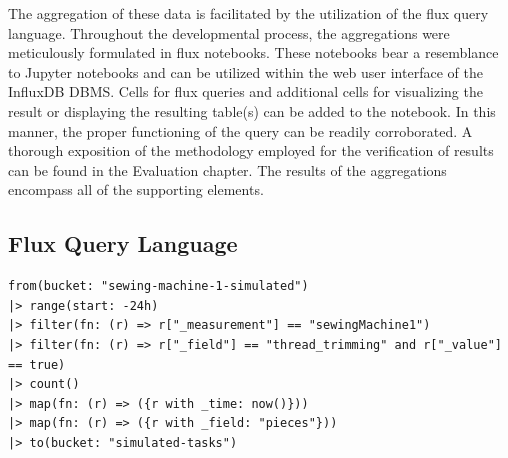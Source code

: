The aggregation of these data is facilitated by the utilization of the flux query language. Throughout the developmental process, the aggregations were meticulously formulated in flux notebooks. These notebooks bear a resemblance to Jupyter notebooks and can be utilized within the web user interface of the InfluxDB DBMS. Cells for flux queries and additional cells for visualizing the result or displaying the resulting table(s) can be added to the notebook. In this manner, the proper functioning of the query can be readily corroborated. A thorough exposition of the methodology employed for the verification of results can be found in the Evaluation chapter. The results of the aggregations encompass all of the supporting elements.

\subsection{Flux Query Language}
\begin{lstlisting}[style=FluxStyle, caption={Flux aggregation query for produced quantity}]
from(bucket: "sewing-machine-1-simulated")
|> range(start: -24h)
|> filter(fn: (r) => r["_measurement"] == "sewingMachine1")
|> filter(fn: (r) => r["_field"] == "thread_trimming" and r["_value"] == true)
|> count()
|> map(fn: (r) => ({r with _time: now()}))
|> map(fn: (r) => ({r with _field: "pieces"}))
|> to(bucket: "simulated-tasks")
\end{lstlisting}
